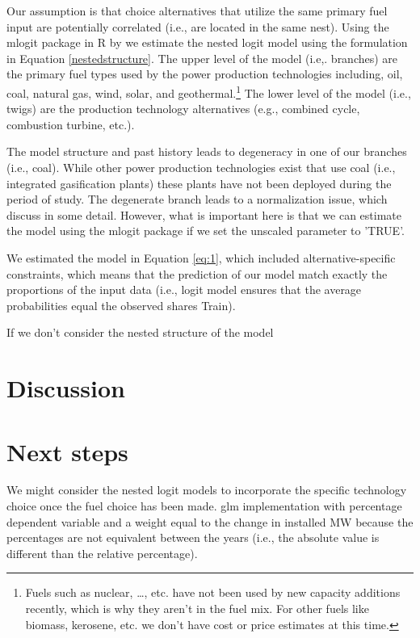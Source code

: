 \documentclass[10pt]{amsart}
\begin{document}
Our assumption is that choice alternatives that utilize the same primary fuel input are potentially correlated (i.e., are located in the same nest). 
Using the mlogit package in R by \cite{mlogit2013} we estimate the nested logit model using the formulation in Equation \ref{nestedstructure}. 
The upper level of the model (i.e,. branches) are the primary fuel types used by the power production technologies including, oil, coal, natural gas, wind, solar, and geothermal.\footnote{Fuels such as nuclear, \ldots, etc. have not been used by new capacity additions recently, which is why they aren't in the fuel mix. For other fuels like biomass, kerosene, etc. we don't have cost or price estimates at this time.}
The lower level of the model (i.e., twigs) are the production technology alternatives (e.g., combined cycle, combustion turbine, etc.). 

The model structure and past history leads to degeneracy in one of our branches (i.e., coal). 
While other power production technologies exist that use coal (i.e., integrated gasification plants) these plants have not been deployed during the period of study.
The degenerate branch leads to a normalization issue, which \cite{hensher2002specification} discuss in some detail.
However, what is important here is that we can estimate the model using the mlogit package if we set the unscaled parameter to 'TRUE'. 

We estimated the model in Equation \ref{eq:1}, which included alternative-specific constraints, which means that the prediction of our model match exactly the proportions of the input data (i.e., logit model ensures that the average probabilities equal the observed shares \cite{} Train). 
 
If we don't consider the nested structure of the model 

\section{Discussion}


\section{Next steps}
We might consider the nested logit models to incorporate the specific technology choice once the fuel choice has been made. 
glm implementation with percentage dependent variable and a weight equal to the change in installed MW because the percentages are not equivalent between the years (i.e., the absolute value is different than the relative percentage). 
\end{document}
